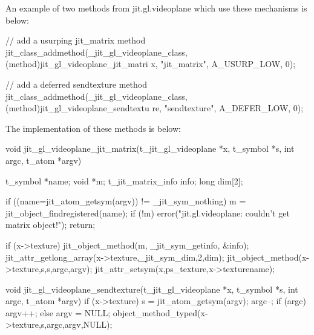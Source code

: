 An example of two methods from jit.gl.videoplane which use these mechanisms is below:


\begin{DoxyCode}
// add a usurping jit_matrix method
jit_class_addmethod(_jit_gl_videoplane_class, (method)jit_gl_videoplane_jit_matri
      x,   "jit_matrix", A_USURP_LOW, 0);   

// add a deferred sendtexture method
jit_class_addmethod(_jit_gl_videoplane_class, (method)jit_gl_videoplane_sendtextu
      re,   "sendtexture",  A_DEFER_LOW, 0);   

The implementation of these methods is below:

void jit_gl_videoplane_jit_matrix(t_jit_gl_videoplane *x, t_symbol *s, int argc, 
      t_atom *argv)
{
   t_symbol *name;
   void *m;
   t_jit_matrix_info info;
   long dim[2];
   
   if ((name=jit_atom_getsym(argv)) != _jit_sym_nothing) {
      m = jit_object_findregistered(name);
      if (!m) {
         error("jit.gl.videoplane: couldn't get matrix object!");
         return;
      }
   }
   
   if (x->texture) {            
      jit_object_method(m, _jit_sym_getinfo, &info);
      jit_attr_getlong_array(x->texture,_jit_sym_dim,2,dim);
      jit_object_method(x->texture,s,s,argc,argv);
      jit_attr_setsym(x,ps_texture,x->texturename);
   }
}   

void jit_gl_videoplane_sendtexture(t_jit_gl_videoplane *x, t_symbol *s, int argc,
       t_atom *argv)
{
   if (x->texture) {
      s = jit_atom_getsym(argv);
      argc--;
      if (argc)
         argv++;
      else
         argv = NULL;   
      object_method_typed(x->texture,s,argc,argv,NULL);
   }
}   
\end{DoxyCode}



